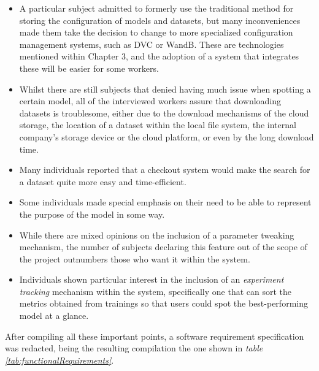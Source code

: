 \begin{itemize}
    \item A particular subject admitted to formerly use the traditional method for storing the configuration of models and datasets, but many inconveniences made them take the decision
    to change to more specialized configuration management systems, such as DVC or WandB. These are technologies mentioned within Chapter 3, and the adoption of a system that integrates these
    will be easier for some workers.

    \item Whilst there are still subjects that denied having much issue when spotting a certain model, all of the interviewed workers assure that downloading datasets is troublesome, either
    due to the download mechanisms of the cloud storage, the location of a dataset within the local file system, the internal company's storage device or the cloud platform, or even by the
    long download time.

    \item Many individuals reported that a checkout system would make the search for a dataset quite more easy and time-efficient.

    \item Some individuals made special emphasis on their need to be able to represent the purpose of the model in some way.

    \item While there are mixed opinions on the inclusion of a parameter tweaking mechanism, the number of subjects declaring this feature out of the scope of the project outnumbers those who
    want it within the system.

    \item Individuals shown particular interest in the inclusion of an \emph{experiment tracking} mechanism within the system, specifically one that can sort the metrics obtained from
    trainings so that users could spot the best-performing model at a glance.
\end{itemize}

After compiling all these important points, a software requirement specification was redacted, being the resulting compilation the one shown in \emph{table \ref{tab:functionalRequirements}}.

